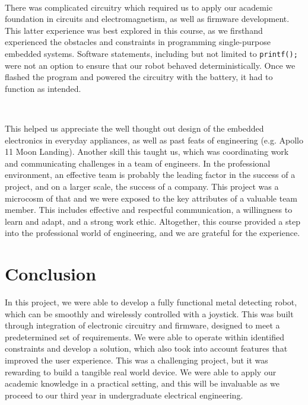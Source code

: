 \documentclass{article}
\begin{document}
\

There was complicated circuitry which required us to apply our academic foundation in
circuits and electromagnetism, as well as firmware development. This latter experience was best explored in this course, as we firsthand experienced the obstacles and constraints in programming single-purpose embedded systems. Software statements, including but not limited to
\texttt{printf();} were not an option to ensure that our robot behaved deterministically. Once we flashed the program and powered the circuitry with the battery, it had to function as intended.

\

This helped us appreciate the well thought out design of the embedded electronics in everyday appliances, as well as past feats of engineering (e.g. Apollo 11 Moon Landing). Another skill this taught us, which
was coordinating work and communicating challenges in a team of engineers. In the professional environment, an effective team is probably the leading factor in the success of a project, and
on a larger scale, the success of a company. This project was a microcosm of that and we were exposed to the key attributes of a valuable team member. This includes effective and respectful communication,
a willingness to learn and adapt, and a strong work ethic. Altogether, this course provided a step into the professional world of engineering, and we are grateful for the experience.


\section{Conclusion}

In this project, we were able to develop a fully functional metal detecting robot, which can be smoothly and wirelessly controlled with a joystick.
This was built through integration of electronic circuitry and firmware, designed to meet a predetermined set of requirements.
We were able to operate within identified constraints and develop a solution, which also took into account features that
improved the user experience. This was a challenging project, but it was rewarding to build a tangible real world device.
We were able to apply our academic knowledge in a practical setting, and this will be invaluable as we proceed to our third year in undergraduate electrical engineering.

\renewcommand{\refname}{}

\newpage
\end{document}
